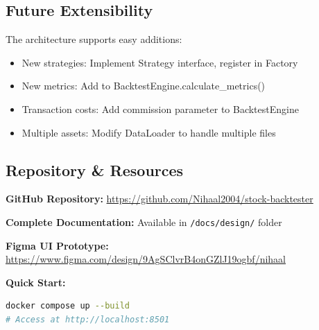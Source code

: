 \documentclass[11pt,a4paper]{article}
\begin{document}
\subsection{Future Extensibility}
The architecture supports easy additions:
\begin{itemize}[leftmargin=*, itemsep=0pt]
    \item New strategies: Implement Strategy interface, register in Factory
    \item New metrics: Add to BacktestEngine.calculate\_metrics()
    \item Transaction costs: Add commission parameter to BacktestEngine
    \item Multiple assets: Modify DataLoader to handle multiple files
\end{itemize}

\subsection{Repository \& Resources}
\textbf{GitHub Repository:} \url{https://github.com/Nihaal2004/stock-backtester}

\textbf{Complete Documentation:} Available in \texttt{/docs/design/} folder

\textbf{Figma UI Prototype:} \url{https://www.figma.com/design/9AgSClvrB4onGZlJ19ogbf/nihaal}

\textbf{Quick Start:}
\begin{lstlisting}[language=bash]
docker compose up --build
# Access at http://localhost:8501
\end{lstlisting}
\end{document}
